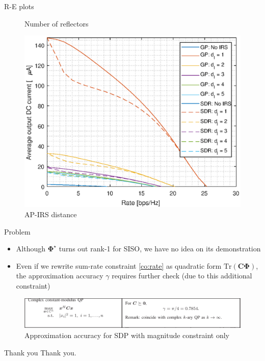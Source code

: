 \documentclass[9pt]{beamer}
\begin{document}
\begin{frame}{R-E plots}
\begin{figure}[ht]
\begin{minipage}[b]{0.5\linewidth}
            \caption{Number of reflectors}
        \end{minipage}%
        \begin{minipage}[b]{0.5\linewidth}
            \centering
            \includegraphics[width=.65\linewidth]{assets/week_29_re_distance.eps}
            \caption{AP-IRS distance}
        \end{minipage}
    \end{figure}
\end{frame}

\begin{frame}{Problem}
    \begin{itemize}
        \item Although $\boldsymbol{\Phi}^{\star}$ turns out rank-1 for SISO, we have no idea on its demonstration
        \item Even if we rewrite sum-rate constraint \ref{co:rate} as quadratic form $\mathrm{Tr}(\boldsymbol{C}\boldsymbol{\Phi})$, the approximation accuracy $\gamma$ requires further check (due to this additional constraint)
    \end{itemize}
    \vspace{1em}
    \begin{figure}
        \centering
        \includegraphics[width=0.8\linewidth]{assets/accuracy.eps}
        \caption{Approximation accuracy for SDP with magnitude constraint only}
    \end{figure}
\end{frame}

\begin{frame}{Thank you}
    \centering
    Thank you.
\end{frame}
\end{document}
